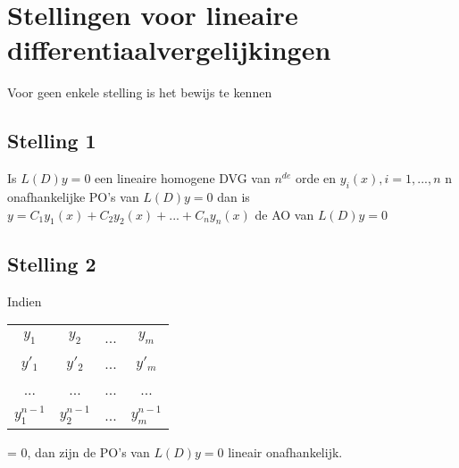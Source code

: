 \section{Stellingen voor lineaire differentiaalvergelijkingen}
Voor geen enkele stelling is het bewijs te kennen
\subsection{Stelling 1}
Is $L(D)y = 0$ een lineaire homogene DVG van $n^{de}$ orde en $y_i(x), i = 1, ..., n$ n onafhankelijke PO's van $L(D)y = 0$ dan is $y = C_1y_1(x) + C_2y_2(x) + ... + C_ny_n(x)$ de AO van $L(D)y = 0$

\subsection{Stelling 2}
Indien 
\begin{tabular}{| c c c c |}
 $y_1$          & $y_2$         & ... & $y_m$ \\
 $y'_1$         & $y'_2$        & ... & $y'_m$ \\
 ...            & ...           & ... & ...   \\
 $y^{n - 1}_1$  & $y^{n - 1}_2$ & ... & $y^{n - 1}_m$ 
\end{tabular} = 0, dan zijn de PO's van $L(D)y = 0$ lineair onafhankelijk.
